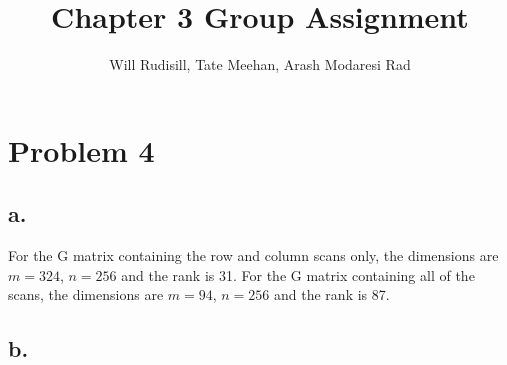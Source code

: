 \documentclass{article}
\title{Chapter 3 Group Assignment}
\author{Will Rudisill, Tate Meehan, Arash Modaresi Rad}
\begin{document}
\maketitle

\section*{Problem 4}
\subsection*{a.}
For the G matrix containing the row and column scans only, the dimensions are $m=324$, $n=256$ and the rank is 31. For the G  matrix containing all of the scans, the dimensions are $m=94$, $n=256$ and the rank is 87. 
\subsection*{b.}
\end{document}
